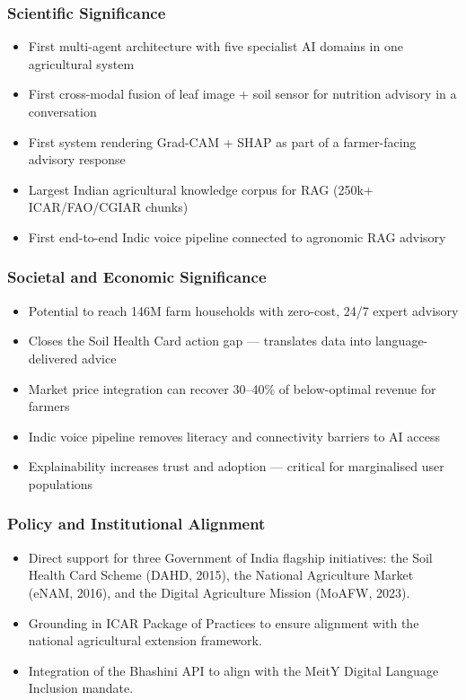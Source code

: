 \documentclass[12pt,a4paper]{article}
\begin{document}
\subsubsection{Scientific Significance}
\begin{itemize}
    \item First multi-agent architecture with five specialist AI domains in one agricultural system
    \item First cross-modal fusion of leaf image + soil sensor for nutrition advisory in a conversation
    \item First system rendering Grad-CAM + SHAP as part of a farmer-facing advisory response
    \item Largest Indian agricultural knowledge corpus for RAG (250k+ ICAR/FAO/CGIAR chunks)
    \item First end-to-end Indic voice pipeline connected to agronomic RAG advisory
\end{itemize}

\subsubsection{Societal and Economic Significance}
\begin{itemize}
    \item Potential to reach 146M farm households with zero-cost, 24/7 expert advisory
    \item Closes the Soil Health Card action gap --- translates data into language-delivered advice
    \item Market price integration can recover 30--40\% of below-optimal revenue for farmers
    \item Indic voice pipeline removes literacy and connectivity barriers to AI access
    \item Explainability increases trust and adoption --- critical for marginalised user populations
\end{itemize}

\subsubsection{Policy and Institutional Alignment}
\begin{itemize}
    \item Direct support for three Government of India flagship initiatives: the Soil Health Card Scheme (DAHD, 2015), the National Agriculture Market (eNAM, 2016), and the Digital Agriculture Mission (MoAFW, 2023).
    \item Grounding in ICAR Package of Practices to ensure alignment with the national agricultural extension framework.
    \item Integration of the Bhashini API to align with the MeitY Digital Language Inclusion mandate.
\end{itemize}
\end{document}
